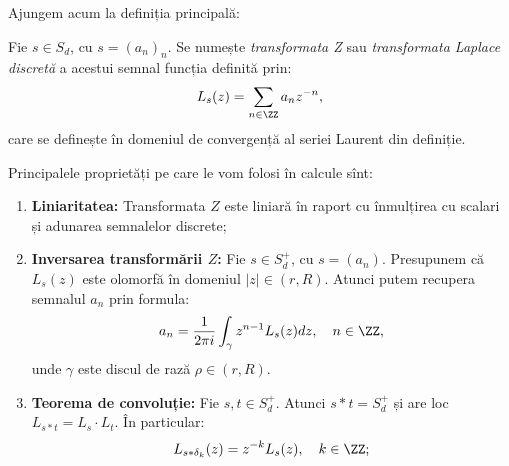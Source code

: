 Ajungem acum la definiția principală:
\begin{definition}\label{def:z}
    Fie $ s \in S_d $, cu $ s = (a_n)_n $. Se numește \emph{transformata Z} sau
    \emph{transformata Laplace discretă} a acestui semnal funcția definită prin:
    \[
        L_s(z) = \sum_{n \in \ZZ} a_n z^{-n},
    \]
    care se definește în domeniul de convergență al seriei Laurent din definiție.
\end{definition}

Principalele proprietăți pe care le vom folosi în calcule sînt:
\begin{enumerate}[(1)]
    \item \textbf{Liniaritatea:} Transformata $ Z $ este liniară în raport
    cu înmulțirea cu scalari și adunarea semnalelor discrete;
    \item \textbf{Inversarea transformării $ Z $:} Fie $ s \in S_d^+ $, cu $ s = (a_n) $.
        Presupunem că $ L_s(z) $ este olomorfă în domeniul $ |z| \in (r, R) $. Atunci
        putem recupera semnalul $ a_n $ prin formula:
        \[
            a_n = \dfrac{1}{2 \pi i} \int_{\gamma} z^{n-1} L_s(z) dz, \quad n \in \ZZ,
        \]
        unde $ \gamma $ este discul de rază $ \rho \in (r, R) $.
    \item \textbf{Teorema de convoluție:} Fie $ s, t \in S_d^+ $. Atunci $ s \ast t = S_d^+ $
        și are loc $ L_{s \ast t} = L_s \cdot L_t $. În particular:
        \[
            L_{s \ast \delta_k}(z) = z^{-k} L_s(z), \quad k \in \ZZ;
        \]
\end{enumerate}

